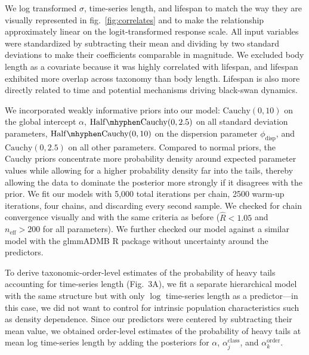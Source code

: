\documentclass[12pt]{article}
\begin{document}
We log transformed \(\sigma\), time-series length, and lifespan to match the way they are visually represented in fig.~\ref{fig:correlates} and to make the relationship approximately linear on the logit-transformed response scale. All input variables were standardized by subtracting their mean and dividing by two standard deviations to make their coefficients comparable in magnitude\cite{gelman2008c}. We excluded body length as a covariate because it was highly correlated with lifespan, and lifespan exhibited more overlap across taxonomy than body length. Lifespan is also more directly related to time and potential mechanisms driving black-swan dynamics.

We incorporated weakly informative priors into our model: \(\mathrm{Cauchy}(0, 10)\) on the global intercept \(\alpha\), \(\mathrm{Half\mhyphen Cauchy}(0, 2.5)\) on all standard deviation parameters, \(\mathrm{Half\mhyphen Cauchy}(0, 10)\) on the dispersion parameter \(\phi_\mathrm{disp}\), and \(\mathrm{Cauchy}(0, 2.5)\) on all other parameters\cite{gelman2006c, gelman2008d}. Compared to normal priors, the Cauchy priors concentrate more probability density around expected parameter values while allowing for a higher probability density far into the tails, thereby allowing the data to dominate the posterior more strongly if it disagrees with the prior. We fit our models with 5,000 total iterations per chain, 2500 warm-up iterations, four chains, and discarding every second sample. We checked for chain convergence visually and with the same criteria as before (\(\widehat{R} < 1.05\) and \(n_\mathrm{eff} >200\) for all parameters). We further checked our model against a similar model with the glmmADMB \textsf{R} package\cite{glmmadmb} without uncertainty around the predictors.

To derive taxonomic-order-level estimates of the probability of heavy tails accounting for time-series length (Fig.~3A), we fit a separate hierarchical model with the same structure but with only \(\log\) time-series length as a predictor---in this case, we did not want to control for intrinsic population characteristics such as density dependence. Since our predictors were centered by subtracting their mean value, we obtained order-level estimates of the probability of heavy tails at mean log time-series length by adding the posteriors for \(\alpha\), \(\alpha^\mathrm{class}_j\), and \(\alpha^\mathrm{order}_k\).
\end{document}
